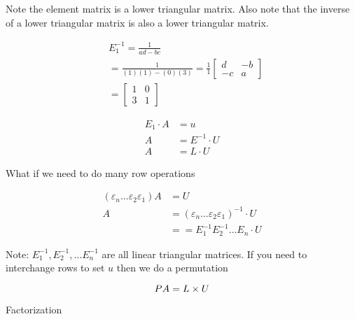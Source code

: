 \documentclass[main.tex]{subfiles}
\begin{document}
    Note the element matrix is a lower triangular matrix. Also note that the inverse of a lower triangular matrix is also a lower triangular matrix.

    $$
    \begin{aligned}
    &E_{1}^{-1}=\frac{1}{a d-b c}\\
    &=\frac{1}{(1)(1)-(0)(3)}=\frac{1}{1}\left[\begin{array}{cc}
    d & -b \\
    -c & a
    \end{array}\right]\\
    &=\left[\begin{array}{ll}
    1 & 0 \\
    3 & 1
    \end{array}\right]
    \end{aligned}
    $$

    $$
    \begin{aligned}
    E_{1} \cdot A & = u\\
    A & = E^{-1} \cdot U\\
    A & = L \cdot U
    \end{aligned}
    $$

    What if we need to do many row operations

    $$
    \begin{aligned}
    \left(\varepsilon_{n} \ldots \varepsilon_{2} \varepsilon_{1}\right) A &= U \\
    A &=\left(\varepsilon_{n} \ldots \varepsilon_{2} \varepsilon_{1}\right)^{-1} \cdot U \\
    & = =E_{1}^{-1} E_{2}^{-1} \ldots E_{n} \cdot U 
    \end{aligned}
    $$

    Note: $E_{1}^{-1}, E_{2}^{-1}, \ldots E_{n}^{-1}$ are all linear triangular matrices. If you need to interchange rows to set $u$ then we do a permutation

    $$
    PA =L \times U\\
    $$

    Factorization
\end{document}
